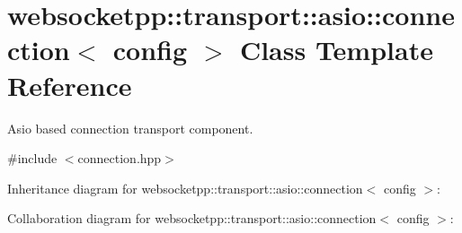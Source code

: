 \hypertarget{classwebsocketpp_1_1transport_1_1asio_1_1connection}{}\section{websocketpp\+:\+:transport\+:\+:asio\+:\+:connection$<$ config $>$ Class Template Reference}
\label{classwebsocketpp_1_1transport_1_1asio_1_1connection}


Asio based connection transport component.  




{\ttfamily \#include $<$connection.\+hpp$>$}



Inheritance diagram for websocketpp\+:\+:transport\+:\+:asio\+:\+:connection$<$ config $>$\+:


Collaboration diagram for websocketpp\+:\+:transport\+:\+:asio\+:\+:connection$<$ config $>$\+:
